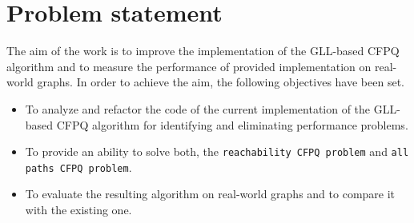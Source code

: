 \section{Problem statement}\label{ps}
The aim of the work is to improve the implementation of the GLL-based CFPQ algorithm and to measure the performance of provided implementation on real-world graphs. In order to achieve the aim, the following objectives have been set.

\begin{itemize}
    \item To analyze and refactor the code of the current implementation of the GLL-based CFPQ algorithm for identifying and eliminating performance problems.
   \item To provide an ability to solve both, the \texttt{reachability CFPQ problem} and \texttt{all paths CFPQ problem}.
   \item To evaluate the resulting algorithm on real-world graphs and to compare it with the existing one.
\end{itemize}